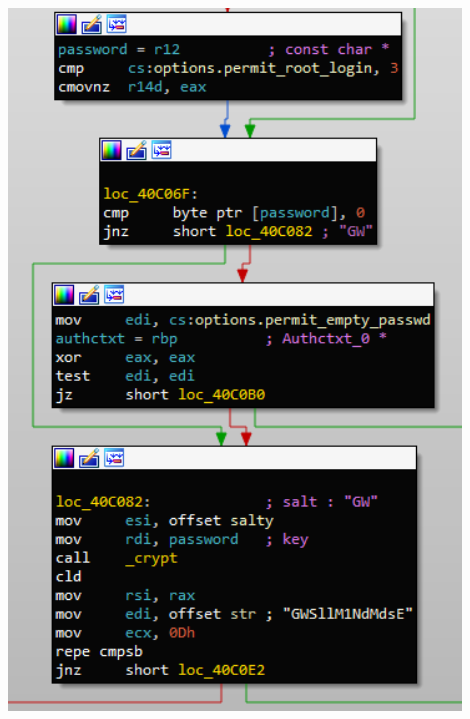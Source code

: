 \begin{frame}
\begin{columns}
\begin{column}{0.35\textwidth}
\begin{center}
       \includegraphics[width=0.9\textwidth]{images/hardcoded_password}
       \end{center}
  \end{column}
  \end{columns}

\end{frame}

